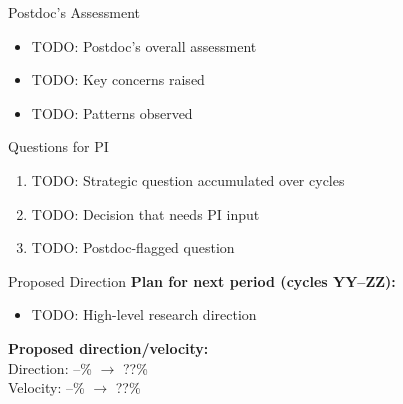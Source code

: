 \documentclass[aspectratio=169,11pt]{beamer}
\newcommand{\directionval}{--}
\newcommand{\velocityval}{--}
\begin{document}
\begin{frame}{Postdoc's Assessment}
  \begin{itemize}
    \item TODO: Postdoc's overall assessment
    \item TODO: Key concerns raised
    \item TODO: Patterns observed
  \end{itemize}
\end{frame}

\begin{frame}{Questions for PI}
  \begin{enumerate}
    \item TODO: Strategic question accumulated over cycles
    \item TODO: Decision that needs PI input
    \item TODO: Postdoc-flagged question
  \end{enumerate}
\end{frame}

\begin{frame}{Proposed Direction}
  \textbf{Plan for next period (cycles YY--ZZ):}
  \begin{itemize}
    \item TODO: High-level research direction
  \end{itemize}

  \vspace{1em}

  \textbf{Proposed direction/velocity:} \\
  Direction: \directionval\% $\rightarrow$ ??\% \\
  Velocity: \velocityval\% $\rightarrow$ ??\%
\end{frame}
\end{document}
